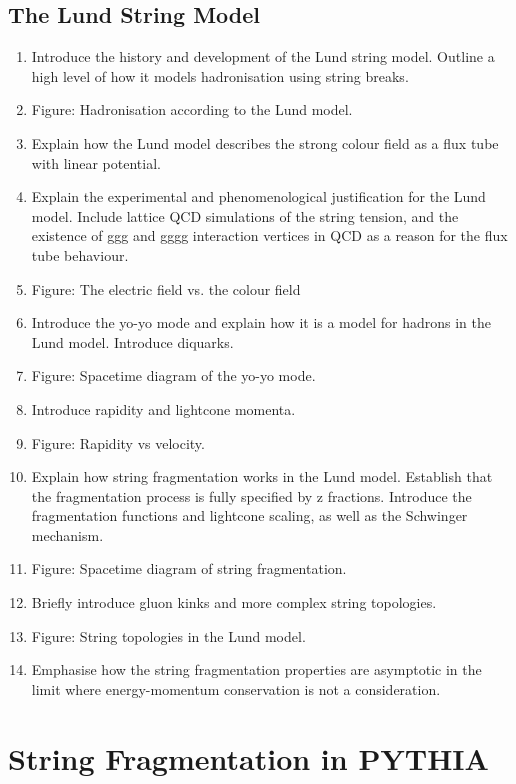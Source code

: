 \documentclass[12pt,a4paper]{report}
\begin{document}
\section{The Lund String Model}
\label{sec:lsm}
\begin{enumerate}
\item Introduce the history and development of the Lund string model. Outline a high level of how it models hadronisation using string breaks.
\item Figure: Hadronisation according to the Lund model.
\item Explain how the Lund model describes the strong colour field as a flux tube with linear potential.
\item Explain the experimental and phenomenological justification for the Lund model. Include lattice QCD simulations of the string tension, and the existence of ggg and gggg interaction vertices in QCD as a reason for the flux tube behaviour.
\item Figure: The electric field vs. the colour field
\item Introduce the yo-yo mode and explain how it is a model for hadrons in the Lund model. Introduce diquarks.
\item Figure: Spacetime diagram of the yo-yo mode.
\item Introduce rapidity and lightcone momenta.
\item Figure: Rapidity vs velocity.
\item Explain how string fragmentation works in the Lund model. Establish that the fragmentation process is fully specified by z fractions. Introduce the fragmentation functions and lightcone scaling, as well as the Schwinger mechanism.
\item Figure: Spacetime diagram of string fragmentation.
\item Briefly introduce gluon kinks and more complex string topologies.
\item Figure: String topologies in the Lund model.
\item Emphasise how the string fragmentation properties are asymptotic in the limit where energy-momentum conservation is not a consideration. 
\end{enumerate}

\chapter{String Fragmentation in PYTHIA}
\label{chap:fragmentation}
\end{document}
